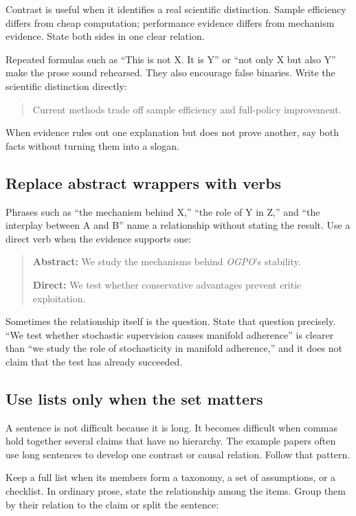 Contrast is useful when it identifies a real scientific distinction. Sample
efficiency differs from cheap computation; performance evidence differs from
mechanism evidence. State both sides in one clear relation.

Repeated formulas such as ``This is not X. It is Y'' or ``not only X but also
Y'' make the prose sound rehearsed. They also encourage false binaries. Write
the scientific distinction directly:

\begin{quote}
Current methods trade off sample efficiency and full-policy improvement.
\end{quote}

When evidence rules out one explanation but does not prove another, say both
facts without turning them into a slogan.

\subsection{Replace abstract wrappers with verbs}

Phrases such as ``the mechanism behind X,'' ``the role of Y in Z,'' and ``the
interplay between A and B'' name a relationship without stating the result.
Use a direct verb when the evidence supports one:

\begin{quote}
\textbf{Abstract:} We study the mechanisms behind \emph{OGPO}'s stability.

\textbf{Direct:} We test whether conservative advantages prevent critic
exploitation.
\end{quote}

Sometimes the relationship itself is the question. State that question
precisely. ``We test whether stochastic supervision causes manifold
adherence'' is clearer than ``we study the role of stochasticity in manifold
adherence,'' and it does not claim that the test has already succeeded.

\subsection{Use lists only when the set matters}

A sentence is not difficult because it is long. It becomes difficult when
commas hold together several claims that have no hierarchy. The example papers
often use long sentences to develop one contrast or causal relation. Follow
that pattern.

Keep a full list when its members form a taxonomy, a set of assumptions, or a
checklist. In ordinary prose, state the relationship among the items. Group
them by their relation to the claim or split the sentence:

